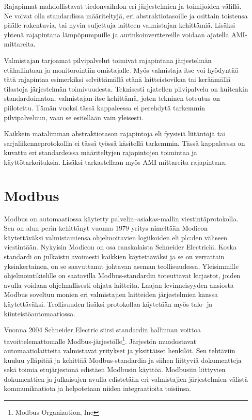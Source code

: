 Rajapinnat mahdollistavat tiedonvaihdon eri järjestelmien ja toimijoiden välillä. Ne voivat olla standardissa määriteltyjä, eri abstraktiotasoille ja osittain toistensa päälle rakentuvia, tai hyvin suljettuja laitteen valmistajan kehittämiä. Lisäksi yhtenä rajapintana lämpöpumpuille ja aurinkoinverttereille voidaan ajatella AMI-mittareita.

Valmistajan tarjoamat pilvipalvelut toimivat rajapintana järjestelmän etähallintaan ja\linebreak -monitorointiin omistajalle. Myös valmistaja itse voi hyödyntää tätä rajapintaa esimerkiksi selvittämällä etänä laitteistovikaa tai keräämällä tilastoja järjestelmän toimivuudesta. Teknisesti ajatellen pilvipalvelu on kuitenkin standardoimaton, valmistajan itse kehittämä, joten tekninen toteutus on piilotettu. Tämän vuoksi tässä kappaleessa ei perehdytä tarkemmin pilvipalveluun, vaan se esitellään vain yleisesti.

Kaikkein matalimman abstraktiotason rajapintoja eli fyysisiä liitäntöjä tai sarjaliikenneprotokollia ei tässä työssä käsitellä tarkemmin. Tässä kappaleessa on kuvattu eri standardeissa määriteltyjen rajapintojen toimintaa ja käyttötarkoituksia. Lisäksi tarkastellaan myös \gls{AMI}-mittareita rajapintana.

\section{Modbus}

  Modbus on automaatiossa käytetty palvelin--asiakas-mallin viestintäprotokolla. Sen on alun perin kehittänyt vuonna 1979 yritys nimeltään Modicon käytettäväksi valmistamiensa ohjelmoitavien logiikoiden eli \Gls{plc}:den väliseen viestintään. Nykyisin Modicon on osa ranskalaista Schneider Electriciä. Koska standardi on julkaistu avoimesti kaikkien käytettäväksi ja se on verrattain yksinkertainen, on se saavuttanut johtavan aseman teollisuudessa. Yleisimmille ohjelmointikielille on saatavilla Modbus-standardin toteuttavat kirjastot, joiden avulla voidaan ohjelmallisesti ohjata laitteita. Laajan levinneisyyden ansiosta Modbus soveltuu monien eri valmistajien laitteiden järjestelmien kanssa käytettäväksi. Teollisuuden lisäksi protokollaa käytetään myös talo- ja kiinteistöautomaatiossa. \mbox{\parencite{sousaPortugal, modbusAppSpec, modbusOrg}}

  Vuonna 2004 Schneider Electric siirsi standardin hallinnan voittoa tavoittelemattomalle Modbus-järjestölle\footnote{Modbus Organization, Inc}. Järjestön muodostavat automaatiolaitteita valmistavat yritykset ja yksittäiset henkilöt. Sen tehtäviin kuuluu ylläpitää ja kehittää Modbus-standardia ja siihen liittyviä dokumentteja sekä toimia etujärjestönä edistäen Modbusin käyttöä. Modbusiin liittyvien dokumenttien ja julkaisujen avulla edistetään eri valmistajien järjestelmien välistä kommunikaatiota ja helpotetaan niiden integraatioita toisiinsa. \parencite{modbusOrg}

